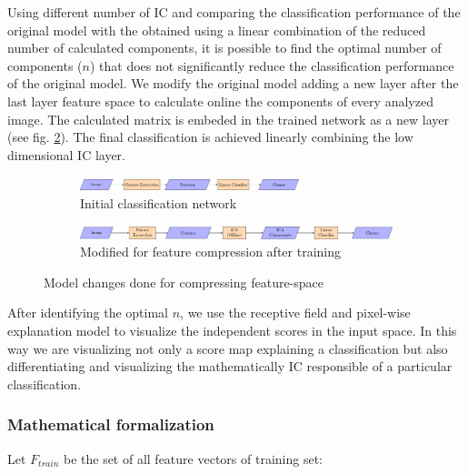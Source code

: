 \documentclass[review]{elsarticle}
\theoremstyle{definition} %
\theoremstyle{remark}
\begin{document}
 Using different number of IC and comparing the classification performance of the original model with the obtained using a linear combination of the reduced number of calculated components, it is possible to find the optimal number of components ($n$) that does not significantly reduce the classification performance of the original model. We modify the original model adding a new layer after the last layer feature space to calculate online the components of every analyzed image. The calculated matrix is embeded in the trained network as a new layer (see fig. \ref{fig:models}). The final classification is achieved linearly combining the low dimensional IC layer. 

\begin{figure}[h!]
	\centering
	\begin{subfigure}[b]{\textwidth}
		\centering
		\includegraphics[width=0.7\textwidth]{./figures/initial_classifier.pdf}
		\caption{Initial classification network}	
	\end{subfigure}
	\hfill   
	\begin{subfigure}[b]{\textwidth}
		\centering
		\includegraphics[width=\textwidth]{./figures/ica_classifier.pdf}
		\caption{Modified for feature compression after training}
		\label{fig:models_ica}
	\end{subfigure}
	\caption{Model changes done for compressing feature-space}  
	\label{fig:models} 
\end{figure}

After identifying the optimal $n$, we use the receptive field and pixel-wise explanation model \cite{de2017deep} to visualize the independent scores in the input space. In this way we are visualizing not only a score map explaining a classification but also differentiating and visualizing the mathematically IC responsible of a particular classification. 

\subsubsection{Mathematical formalization}

Let $F_{train}$ be the set of all feature vectors of training set:
\end{document}
